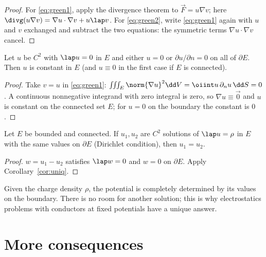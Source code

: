 \begin{proof}
For \eqref{eq:green1}, apply the divergence theorem to $\vec F=u\nabla v$; here $\divg(u\nabla v)=\nabla u\cdot\nabla v+u\lap v$. For \eqref{eq:green2}, write \eqref{eq:green1} again with $u$ and $v$ exchanged and subtract the two equations: the symmetric terms $\nabla u\cdot\nabla v$ cancel.
\end{proof}

\begin{corollary}\label{cor:uniq}
Let $u$ be $C^2$ with $\lap u=0$ in $E$ and either $u=0$ or $\partial u/\partial n=0$ on all of $\partial E$. Then $u$ is constant in $E$ (and $u\equiv0$ in the first case if $E$ is connected).
\end{corollary}

\begin{proof}
Take $v=u$ in \eqref{eq:green1}: $\iiint_E\norm{\nabla u}^2\dd V=\oiint u\,\partial_nu\,\dd S=0$. A continuous nonnegative integrand with zero integral is zero, so $\nabla u\equiv\vec0$ and $u$ is constant on the connected set $E$; for $u=0$ on the boundary the constant is $0$.
\end{proof}

\begin{theorem}\label{thm:poissonuniq}
Let $E$ be bounded and connected. If $u_1,u_2$ are $C^2$ solutions of $\lap u=\rho$ in $E$ with the same values on $\partial E$ (Dirichlet condition), then $u_1=u_2$.
\end{theorem}

\begin{proof}
$w=u_1-u_2$ satisfies $\lap w=0$ and $w=0$ on $\partial E$. Apply Corollary~\ref{cor:uniq}.
\end{proof}

\begin{intuition}
Given the charge density $\rho$, the potential is completely determined by its values on the boundary. There is no room for another solution; this is why electrostatics problems with conductors at fixed potentials have a unique answer.
\end{intuition}

\section{More consequences}

